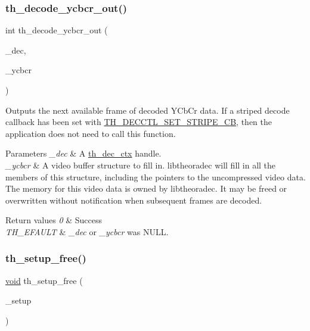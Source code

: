 \subsubsection{\texorpdfstring{th\+\_\+decode\+\_\+ycbcr\+\_\+out()}{th\_decode\_ycbcr\_out()}}
{\footnotesize\ttfamily int th\+\_\+decode\+\_\+ycbcr\+\_\+out (\begin{DoxyParamCaption}\item[{\hyperlink{theoradec_8h_a843d70bb02563885a8d54b9c1a781729}{th\+\_\+dec\+\_\+ctx} $\ast$}]{\+\_\+dec,  }\item[{\hyperlink{theora_2codec_8h_a343f7cfabad179cc4fe527cf06873f45}{th\+\_\+ycbcr\+\_\+buffer}}]{\+\_\+ycbcr }\end{DoxyParamCaption})}

Outputs the next available frame of decoded Y\textquotesingle{}Cb\+Cr data. If a striped decode callback has been set with \hyperlink{theoradec_8h_ac95cc9e109474b0fa4bb920ab2cfdf1e}{T\+H\+\_\+\+D\+E\+C\+C\+T\+L\+\_\+\+S\+E\+T\+\_\+\+S\+T\+R\+I\+P\+E\+\_\+\+CB}, then the application does not need to call this function. 
\begin{DoxyParams}{Parameters}
{\em \+\_\+dec} & A \hyperlink{theoradec_8h_a843d70bb02563885a8d54b9c1a781729}{th\+\_\+dec\+\_\+ctx} handle. \\
\hline
{\em \+\_\+ycbcr} & A video buffer structure to fill in. {\ttfamily libtheoradec} will fill in all the members of this structure, including the pointers to the uncompressed video data. The memory for this video data is owned by {\ttfamily libtheoradec}. It may be freed or overwritten without notification when subsequent frames are decoded. \\
\hline
\end{DoxyParams}

\begin{DoxyRetVals}{Return values}
{\em 0} & Success \\
\hline
{\em T\+H\+\_\+\+E\+F\+A\+U\+LT} & {\itshape \+\_\+dec} or {\itshape \+\_\+ycbcr} was {\ttfamily N\+U\+LL}. \\
\hline
\end{DoxyRetVals}
\mbox{\label{group__decfuncs_gadef55431b68aaa59d0d7b32b2f118f27}} 
\subsubsection{\texorpdfstring{th\+\_\+setup\+\_\+free()}{th\_setup\_free()}}
{\footnotesize\ttfamily \hyperlink{png_8h_ac9c84fa68bbad002983e35ce3663c686}{void} th\+\_\+setup\+\_\+free (\begin{DoxyParamCaption}\item[{\hyperlink{theoradec_8h_ab71cd2657455cc27d6c0127c66a89f28}{th\+\_\+setup\+\_\+info} $\ast$}]{\+\_\+setup }\end{DoxyParamCaption})}

